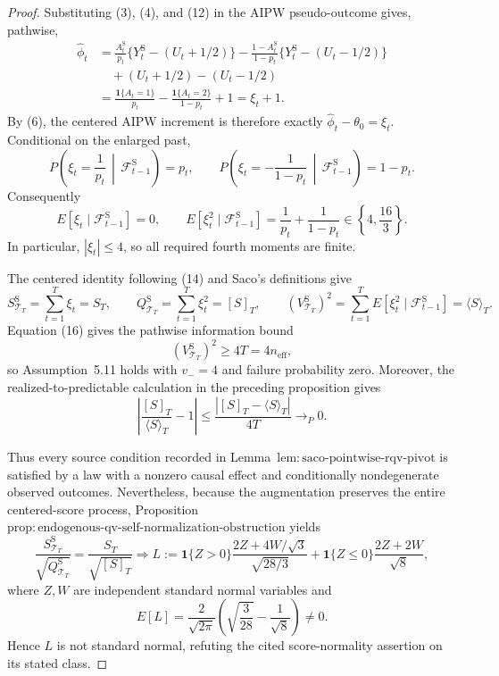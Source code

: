 \documentclass{article}
\begin{document}
\begin{proof}
Substituting (3), (4), and (12) in the AIPW pseudo-outcome gives, pathwise,
\[
\begin{aligned}
\widehat\phi_t
&=\frac{A_t^{\mathrm S}}{p_t}\{Y_t^{\mathrm S}-(U_t+1/2)\}
-\frac{1-A_t^{\mathrm S}}{1-p_t}\{Y_t^{\mathrm S}-(U_t-1/2)\}\\
&\quad +(U_t+1/2)-(U_t-1/2)\\
&=\frac{\mathbf1\{A_t=1\}}{p_t}
-\frac{\mathbf1\{A_t=2\}}{1-p_t}+1
=\xi_t+1.
\end{aligned}
\tag{14}
\]
By (6), the centered AIPW increment is therefore exactly \(\widehat\phi_t-\theta_0=\xi_t\).  Conditional on the enlarged past,
\[
P\!\left(\xi_t=\frac1{p_t}\,\middle|\,\mathcal F_{t-1}^{\mathrm S}\right)=p_t,
\qquad
P\!\left(\xi_t=-\frac1{1-p_t}\,\middle|\,\mathcal F_{t-1}^{\mathrm S}\right)=1-p_t.
\tag{15}
\]
Consequently
\[
E[\xi_t\mid\mathcal F_{t-1}^{\mathrm S}]=0,
\qquad
E[\xi_t^2\mid\mathcal F_{t-1}^{\mathrm S}]
=\frac1{p_t}+\frac1{1-p_t}\in\left\{4,\frac{16}{3}\right\}.
\tag{16}
\]
In particular, \(|\xi_t|\le4\), so all required fourth moments are finite.

The centered identity following (14) and Saco's definitions give
\[
S_{\mathcal T_T}^{\mathrm S}=\sum_{t=1}^T\xi_t=S_T,
\qquad
Q_{\mathcal T_T}^{\mathrm S}=\sum_{t=1}^T\xi_t^2=[S]_T,
\qquad
(V_{\mathcal T_T}^{\mathrm S})^2
=\sum_{t=1}^TE[\xi_t^2\mid\mathcal F_{t-1}^{\mathrm S}]
=\langle S\rangle_T.
\tag{17}
\]
Equation (16) gives the pathwise information bound
\[
(V_{\mathcal T_T}^{\mathrm S})^2\ge4T=4n_{\mathrm{eff}},
\tag{18}
\]
so Assumption~5.11 holds with \(v_-=4\) and failure probability zero.  Moreover, the realized-to-predictable calculation in the preceding proposition gives
\[
\left|\frac{[S]_T}{\langle S\rangle_T}-1\right|
\le\frac{|[S]_T-\langle S\rangle_T|}{4T}\to_P0.
\tag{19}
\]

Thus every source condition recorded in Lemma~\(\mathrm{lem:saco\text{-}pointwise\text{-}rqv\text{-}pivot}\) is satisfied by a law with a nonzero causal effect and conditionally nondegenerate observed outcomes.  Nevertheless, because the augmentation preserves the entire centered-score process, Proposition~\(\mathrm{prop:endogenous\text{-}qv\text{-}self\text{-}normalization\text{-}obstruction}\) yields
\[
\frac{S_{\mathcal T_T}^{\mathrm S}}{\sqrt{Q_{\mathcal T_T}^{\mathrm S}}}
=\frac{S_T}{\sqrt{[S]_T}
}\Longrightarrow
L:=\mathbf1\{Z>0\}\frac{2Z+4W/\sqrt3}{\sqrt{28/3}}
+\mathbf1\{Z\le0\}\frac{2Z+2W}{\sqrt8},
\tag{20}
\]
where \(Z,W\) are independent standard normal variables and
\[
E[L]=\frac2{\sqrt{2\pi}}
\left(\sqrt{\frac3{28}}-\frac1{\sqrt8}\right)\ne0.
\tag{21}
\]
Hence \(L\) is not standard normal, refuting the cited score-normality assertion on its stated class.


\end{proof}
\end{document}
